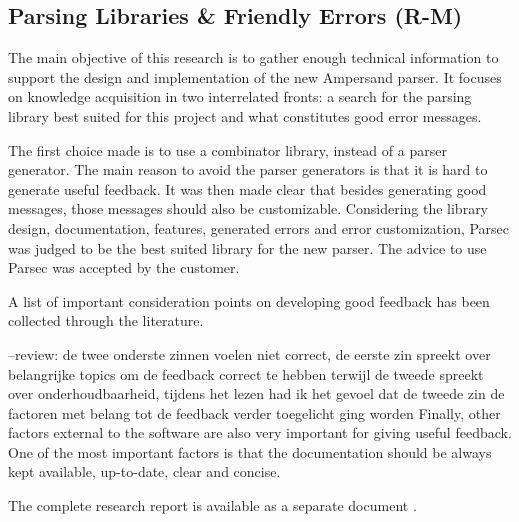 

\subsection{Parsing Libraries \& Friendly Errors (R-M)}
\label{domain:parsing}
The main objective of this research is to gather enough technical information to support the design and implementation of the new Ampersand parser.
It focuses on knowledge acquisition in two interrelated fronts: a search for the parsing library best suited for this project and what constitutes good error messages.

The first choice made is to use a combinator library, instead of a parser generator.
The main reason to avoid the parser generators is that it is hard to generate useful feedback.
It was then made clear that besides generating good messages, those messages should also be customizable.
Considering the library design, documentation, features, generated errors and error customization, Parsec was judged to be the best suited library for the new parser.
The advice to use Parsec was accepted by the customer.

A list of important consideration points on developing good feedback has been collected through the literature.

--review: de twee onderste zinnen voelen niet correct, de eerste zin spreekt over belangrijke topics om de feedback correct te hebben terwijl de tweede spreekt over onderhoudbaarheid, tijdens het lezen had ik het gevoel dat de tweede zin de factoren met belang tot de feedback verder toegelicht ging worden
Finally, other factors external to the software are also very important for giving useful feedback.
One of the most important factors is that the documentation should be always kept available, up-to-date, clear and concise.

The complete research report is available as a separate document .
